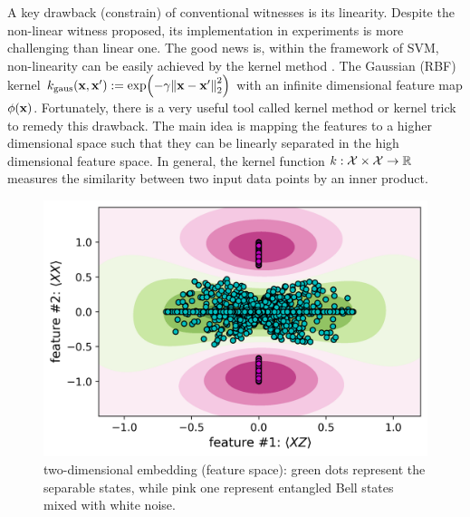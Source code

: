\documentclass[
aps,
pra,
twocolumn,
floatfix,
]{revtex4-2}
\theoremstyle{plain}
\theoremstyle{definition}
\newcommand{\kernel}{k}
\begin{document}
A key drawback (constrain) of conventional witnesses is its linearity.
Despite the non-linear witness \cite{guhneNonlinearEntanglementWitnesses2006} proposed, its implementation in experiments is more challenging than linear one.
The good news is,
within the framework of SVM, non-linearity can be easily achieved by the kernel method \cite{hofmannKernelMethodsMachine2008}.
The Gaussian (RBF) kernel
$\kernel_{\text{gaus}}(\vbx,\vbx') := \exp(-\gamma\norm{\vbx-\vbx'}^2_2)$ 
with an infinite dimensional feature map $\phi(\vb{x})$.
Fortunately, there is a very useful tool called kernel method or kernel trick to remedy this drawback. The main idea is mapping the features to a higher dimensional space such that  they can be linearly separated in the high dimensional feature space.
In general, the kernel function $\kernel:\mathcal{X}\times \mathcal{X} \to \realnumber$ measures the similarity between two input data points by an inner product.
\begin{figure}[!ht]
	\centering
	\includegraphics[width=.9\linewidth]{./Code/feature_space_2d.png}
	\caption{two-dimensional embedding (feature space): green dots represent the separable states, while pink one represent entangled Bell states mixed with white noise.}
	\label{fig:feature_space}
\end{figure}
\end{document}
